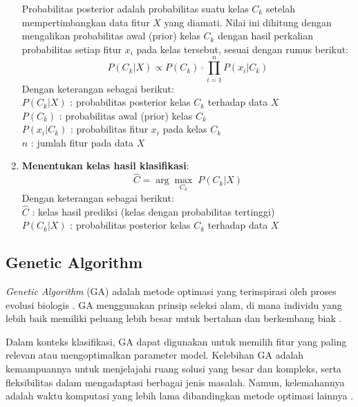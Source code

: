 \begin{enumerate}
		Probabilitas posterior adalah probabilitas suatu kelas $C_k$ setelah mempertimbangkan data fitur $X$ yang diamati. Nilai ini dihitung dengan mengalikan probabilitas awal (prior) kelas $C_k$ dengan hasil perkalian probabilitas setiap fitur $x_i$ pada kelas tersebut, sesuai dengan rumus berikut:
		\begin{equation}
			P(C_k|X) \propto P(C_k) \cdot \prod_{i=1}^{n} P(x_i | C_k)
		\end{equation}
		Dengan keterangan sebagai berikut:\\[0.5em]
		\hspace*{1.5em}$P(C_k|X)$ : probabilitas posterior kelas $C_k$ terhadap data $X$\\
		\hspace*{1.5em}$P(C_k)$ : probabilitas awal (prior) kelas $C_k$\\
		\hspace*{1.5em}$P(x_i | C_k)$ : probabilitas fitur $x_i$ pada kelas $C_k$\\
		\hspace*{1.5em}$n$ : jumlah fitur pada data $X$

		\item \textbf{Menentukan kelas hasil klasifikasi}:
		\begin{equation}
			\hat{C} = \arg\max_{C_k} \; P(C_k|X)
		\end{equation}
		Dengan keterangan sebagai berikut:\\[0.5em]
		\hspace*{1.5em}$\hat{C}$ : kelas hasil prediksi (kelas dengan probabilitas tertinggi)\\
		\hspace*{1.5em}$P(C_k|X)$ : probabilitas posterior kelas $C_k$ terhadap data $X$
\end{enumerate}

\subsection{Genetic Algorithm} \label{II.Genetic Algorithm}
\textit{Genetic Algorithm} (GA) adalah metode optimasi yang terinspirasi oleh proses evolusi biologis . GA menggunakan prinsip seleksi alam, di mana individu yang lebih baik memiliki peluang lebih besar untuk bertahan dan berkembang biak \cite{Zahro2020OptimasiRute}.

Dalam konteks klasifikasi, GA dapat digunakan untuk memilih fitur yang paling relevan atau mengoptimalkan parameter model. Kelebihan GA adalah kemampuannya untuk menjelajahi ruang solusi yang besar dan kompleks, serta fleksibilitas dalam mengadaptasi berbagai jenis masalah. Namun, kelemahannya adalah waktu komputasi yang lebih lama dibandingkan metode optimasi lainnya \cite{Transmisi68957}. 

